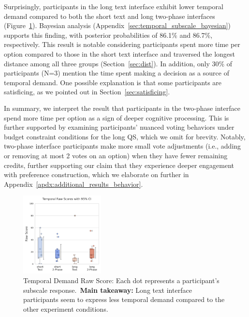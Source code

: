 Surprisingly, participants in the long text interface exhibit lower temporal demand compared to both the short text and long two-phase interfaces (Figure~\ref{fig:temporal_cog_score}). Bayesian analysis (Appendix~\ref{sec:temporal_subscale_bayesian}) supports this finding, with posterior probabilities of 86.1\% and 86.7\%, respectively. This result is notable considering participants spent more time per option compared to those in the short text interface and traversed the longest distance among all three groups (Section~\ref{sec:dist}). In addition, only 30\% of participants (N=3) mention the time spent making a decision as a source of temporal demand. One possible explanation is that some participants are satisficing, as we pointed out in Section~\ref{sec:satisficing}.  

In summary, we interpret the result that participants in the two-phase interface spend more time per option as a sign of deeper cognitive processing. This is further supported by examining participants' nuanced voting behaviors under budget constraint conditions for the long QS, which we omit for brevity. Notably, two-phase interface participants make more small vote adjustments (i.e., adding or removing at most 2 votes on an option) when they have fewer remaining credits, further supporting our claim that they experience deeper engagement with preference construction, which we elaborate on further in Appendix~\ref{apdx:additional_results_behavior}.

\begin{figure}[h]
    \centering
    \includegraphics[width=0.38\textwidth, trim=0 13 0 13, clip]{content/image/cog/Temporal_scores.pdf}
    \caption{Temporal Demand Raw Score: Each dot represents a participant's subscale response.~\textbf{Main takeaway:} Long text interface participants seem to express less temporal demand compared to the other experiment conditions.}
    \vspace{-12pt}
    \label{fig:temporal_cog_score}
\end{figure}
